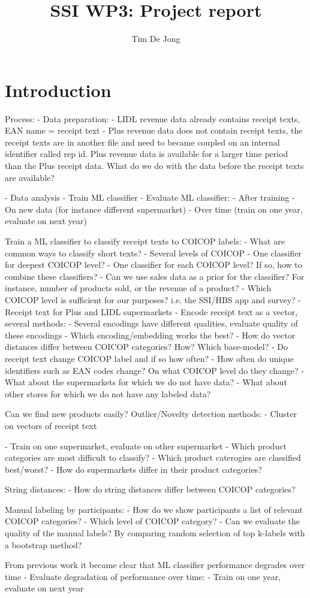 \documentclass{article}
\title{SSI WP3: Project report}
\author{Tim De Jong}
\begin{document}
\maketitle


\section{Introduction}

Process:
- Data preparation:
    - LIDL revenue data already contains receipt texts, EAN name = receipt text
    - Plus revenue data does not contain receipt texts, the receipt texts are in another file and need to became
    coupled on an internal identifier called rep id. Plus revenue data is available for a larger time period than the
    Plus receipt data. What do we do with the data before the receipt texts are available?

- Data analysis
- Train ML classifier
- Evaluate ML classifier:
    - After training
    - On new data (for instance different supermarket)
    - Over time (train on one year, evaluate on next year)




Train a ML classifier to classify receipt texts to COICOP labels:
- What are common ways to classify short texts?
- Several levels of COICOP
    - One classifier for deepest COICOP level?
    - One classifier for each COICOP level? If so, how to combine these classifiers?
    - Can we use sales data as a prior for the classifier? For instance, number of products sold, 
    or the revenue of a product?
    - Which COICOP level is sufficient for our purposes? i.e. the SSI/HBS app and survey?
- Receipt text for Plus and LIDL supermarkets
- Encode receipt text as a vector, several methods: 
    - Several encodings have different qualities, evaluate quality of these encodings
    - Which encoding/embedding works the best?
    - How do vector distances differ between COICOP categories? How? Which base-model?
- Do receipt text change COICOP label and if so how often?
- How often do unique identifiers such as EAN codes change? On what COICOP level do they change?
- What about the supermarkets for which we do not have data? 
- What about other stores for which we do not have any labeled data?
    
Can we find new products easily? Outlier/Novelty detection methods:    
    - Cluster on vectors of receipt text

- Train on one supermarket, evaluate on other supermarket
- Which product categories are most difficult to classify?
- Which product caterogies are classified best/worst?
- How do supermarkets differ in their product categories?

String distances:
- How do string distances differ between COICOP categories?

Manual labeling by participants:
- How do we show participants a list of relevant COICOP categories?
- Which level of COICOP category?
- Can we evaluate the quality of the manual labels? By comparing random selection of top k-labels with a 
bootstrap method?

From previous work it became clear that ML classifier performance degrades over time
- Evaluate degradation of performance over time:
    - Train on one year, evaluate on next year
\end{document}
